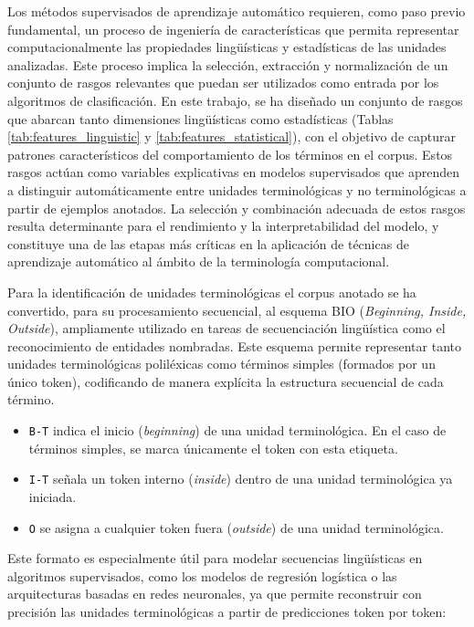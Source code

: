Los métodos supervisados de aprendizaje automático requieren, como paso previo fundamental, un proceso de ingeniería de características que permita representar computacionalmente las propiedades lingüísticas y estadísticas de las unidades analizadas. Este proceso implica la selección, extracción y normalización de un conjunto de rasgos relevantes que puedan ser utilizados como entrada por los algoritmos de clasificación. En este trabajo, se ha diseñado un conjunto de rasgos que abarcan tanto dimensiones lingüísticas como estadísticas (Tablas \ref{tab:features_linguistic} y \ref{tab:features_statistical}), con el objetivo de capturar patrones característicos del comportamiento de los términos en el corpus. Estos rasgos actúan como variables explicativas en modelos supervisados que aprenden a distinguir automáticamente entre unidades terminológicas y no terminológicas a partir de ejemplos anotados. La selección y combinación adecuada de estos rasgos resulta determinante para el rendimiento y la interpretabilidad del modelo, y constituye una de las etapas más críticas en la aplicación de técnicas de aprendizaje automático al ámbito de la terminología computacional.


Para la identificación de unidades terminológicas el corpus anotado se ha convertido, para su procesamiento secuencial, al esquema BIO (\emph{Beginning, Inside, Outside}), ampliamente utilizado en tareas de secuenciación lingüística como el reconocimiento de entidades nombradas. Este esquema permite representar tanto unidades terminológicas poliléxicas como términos simples (formados por un único token), codificando de manera explícita la estructura secuencial de cada término.

\begin{itemize}
    \item \texttt{B-T} indica el inicio (\emph{beginning}) de una unidad terminológica. En el caso de términos simples, se marca únicamente el token con esta etiqueta.
    \item \texttt{I-T} señala un token interno (\emph{inside}) dentro de una unidad terminológica ya iniciada.
    \item \texttt{O} se asigna a cualquier token fuera (\emph{outside}) de una unidad terminológica.
\end{itemize}

Este formato es especialmente útil para modelar secuencias lingüísticas en algoritmos supervisados, como los modelos de regresión logística o las arquitecturas basadas en redes neuronales, ya que permite reconstruir con precisión las unidades terminológicas a partir de predicciones token por token:

